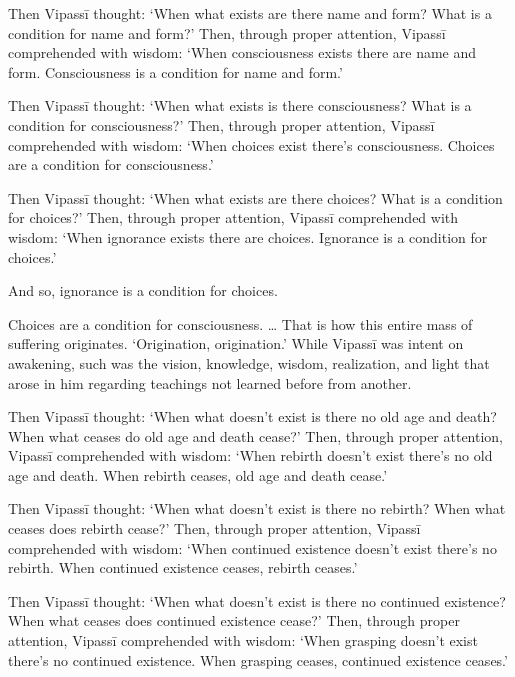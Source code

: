 \documentclass[12pt,openany]{book}%
\begin{document}
Then \textsanskrit{Vipassī} thought: ‘When what exists are there name and form? What is a condition for name and form?’ Then, through proper attention, \textsanskrit{Vipassī} comprehended with wisdom: ‘When consciousness exists there are name and form. Consciousness is a condition for name and form.’ 

Then \textsanskrit{Vipassī} thought: ‘When what exists is there consciousness? What is a condition for consciousness?’ Then, through proper attention, \textsanskrit{Vipassī} comprehended with wisdom: ‘When choices exist there’s consciousness. Choices are a condition for consciousness.’ 

Then \textsanskrit{Vipassī} thought: ‘When what exists are there choices? What is a condition for choices?’ Then, through proper attention, \textsanskrit{Vipassī} comprehended with wisdom: ‘When ignorance exists there are choices. Ignorance is a condition for choices.’ 

And so, ignorance is a condition for choices. 

Choices are a condition for consciousness. … That is how this entire mass of suffering originates. ‘Origination, origination.’ While \textsanskrit{Vipassī} was intent on awakening, such was the vision, knowledge, wisdom, realization, and light that arose in him regarding teachings not learned before from another. 

Then \textsanskrit{Vipassī} thought: ‘When what doesn’t exist is there no old age and death? When what ceases do old age and death cease?’ Then, through proper attention, \textsanskrit{Vipassī} comprehended with wisdom: ‘When rebirth doesn’t exist there’s no old age and death. When rebirth ceases, old age and death cease.’ 

Then \textsanskrit{Vipassī} thought: ‘When what doesn’t exist is there no rebirth? When what ceases does rebirth cease?’ Then, through proper attention, \textsanskrit{Vipassī} comprehended with wisdom: ‘When continued existence doesn’t exist there’s no rebirth. When continued existence ceases, rebirth ceases.’ 

Then \textsanskrit{Vipassī} thought: ‘When what doesn’t exist is there no continued existence? When what ceases does continued existence cease?’ Then, through proper attention, \textsanskrit{Vipassī} comprehended with wisdom: ‘When grasping doesn’t exist there’s no continued existence. When grasping ceases, continued existence ceases.’ 
\end{document}
